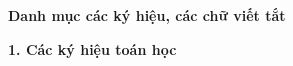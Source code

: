 \clearpage
\thispagestyle{empty}
\renewcommand{\contentsname}{\hfill MỤC LỤC \hfill}
\tableofcontents

\clearpage
\thispagestyle{empty}
\begin{center}
{\fontsize{14}{17}\bfseries\MakeUppercase Danh mục các ký hiệu, các chữ viết tắt\par}
\end{center}
\vspace{0.4cm}

\noindent\textbf{1. Các ký hiệu toán học}\par
\vspace{0.2cm}

\renewcommand{\arraystretch}{1.2}
\setlength{\tabcolsep}{4pt}
